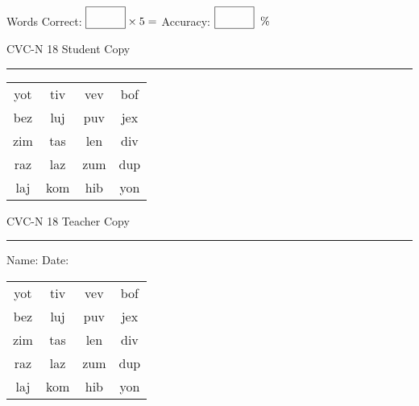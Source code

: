 \documentclass{memoir}
\begin{document}
\small

Words Correct: $\fbox{\phantom{\huge 100}} \times 5 = $ Accuracy: $\fbox{\phantom{\huge 100}}\;\; \%$ 

\vfill

\newpage


\footnotesize \noindent
CVC-N 18 \hfill Student Copy
\smallskip
\hrule

\Large

\setlength{\tabcolsep}{14pt}
\def\arraystretch{2}

{\selectfont


\begin{vplace}[0.5]
\begin{center}
\begin{tabular}{cccc}
yot & tiv & vev & bof \\
bez & luj & puv & jex \\
zim & tas & len & div \\
raz & laz & zum & dup \\
laj & kom & hib & yon \\
\end{tabular}
\end{center}
\end{vplace}

}

\newpage

\footnotesize \noindent
CVC-N 18 \hfill Teacher Copy
\smallskip
\hrule

\small

\vfill

\noindent
Name: \underline{\hspace{1.75in}} \hfill Date: \underline{\hspace{1in}}

\Large

{\selectfont


\begin{vplace}[0.5]
\begin{center}
\begin{tabular}{cccc}
yot & tiv & vev & bof \\
bez & luj & puv & jex \\
zim & tas & len & div \\
raz & laz & zum & dup \\
laj & kom & hib & yon \\
\end{tabular}
\end{center}
\end{vplace}



}
\end{document}

